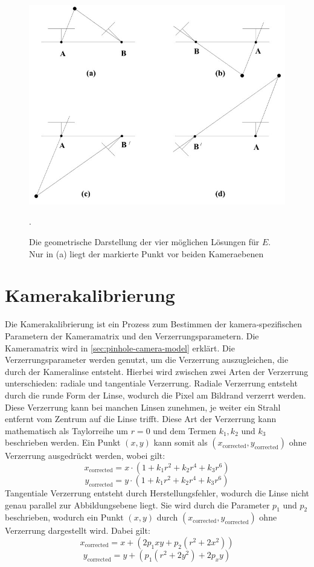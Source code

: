 \begin{figure}[h!]
    \includegraphics[width=\textwidth]{src/img/hartley_2003_e_geometry.jpg}
    \caption{Die geometrische Darstellung der vier möglichen Lösungen für $E$. Nur in (a) liegt der markierte Punkt vor beiden Kameraebenen~\cite[Fig. 9.12]{hartley_2003}}.
    \label{fig:theory-essential-matrix-geometry}
\end{figure}

\section{Kamerakalibrierung}
Die Kamerakalibrierung ist ein Prozess zum Bestimmen der kamera-spezifischen Parametern der Kameramatrix und den Verzerrungsparametern. 
Die Kameramatrix wird in \cref{sec:pinhole-camera-model} erklärt.
Die Verzerrungsparameter werden genutzt, um die Verzerrung auszugleichen, die durch der Kameralinse entsteht.
Hierbei wird zwischen zwei Arten der Verzerrung unterschieden: radiale und tangentiale Verzerrung.
Radiale Verzerrung entsteht durch die runde Form der Linse, wodurch die Pixel am Bildrand verzerrt werden.
Diese Verzerrung kann bei manchen Linsen zunehmen, je weiter ein Strahl entfernt vom Zentrum auf die Linse trifft. 
Diese Art der Verzerrung kann mathematisch als Taylorreihe um $r = 0$ und dem Termen $k_1, k_2$ und $k_3$ beschrieben werden.
Ein Punkt $(x, y)$ kann somit als $(x_{\text{corrected}},y_{\text{corrected}})$ ohne Verzerrung ausgedrückt werden, wobei gilt:
\[x_\text{corrected} = x \cdot (1 + k_1r^2 + k_2r^4 + k_3r^6)\]
\[y_\text{corrected} = y \cdot (1 + k_1r^2 + k_2r^4 + k_3r^6)\]
Tangentiale Verzerrung entsteht durch Herstellungsfehler, wodurch die Linse nicht genau parallel zur Abbildungsebene liegt.  
Sie wird durch die Parameter $p_1$ und $p_2$ beschrieben, wodurch ein Punkt $(x,y)$ durch $(x_{\text{corrected}},y_{\text{corrected}})$ ohne Verzerrung dargestellt wird. 
Dabei gilt:
\[x_\text{corrected} = x + (2p_1xy + p_2(r^2 + 2x^2))\]
\[y_\text{corrected} = y + (p_1(r^2 + 2y^2) + 2p_xy)\]
\cite{kaehler_2016}

